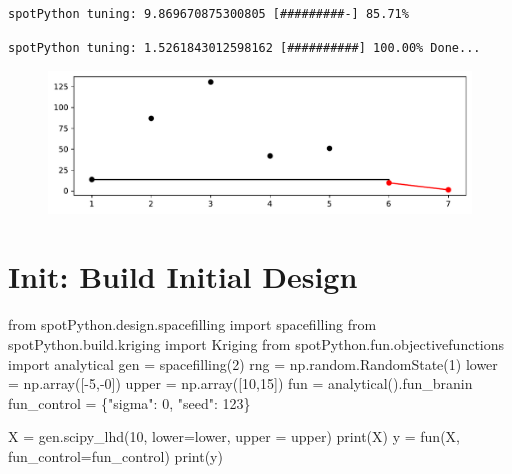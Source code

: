 \documentclass[
  letterpaper,
  DIV=11,
  numbers=noendperiod]{scrreprt}
\newenvironment{Shaded}{\begin{snugshade}}{\end{snugshade}}
\newcommand{\BuiltInTok}[1]{\textcolor[rgb]{0.00,0.23,0.31}{#1}}
\newcommand{\DecValTok}[1]{\textcolor[rgb]{0.68,0.00,0.00}{#1}}
\newcommand{\ImportTok}[1]{\textcolor[rgb]{0.00,0.46,0.62}{#1}}
\newcommand{\NormalTok}[1]{\textcolor[rgb]{0.00,0.23,0.31}{#1}}
\newcommand{\OperatorTok}[1]{\textcolor[rgb]{0.37,0.37,0.37}{#1}}
\newcommand{\StringTok}[1]{\textcolor[rgb]{0.13,0.47,0.30}{#1}}
\begin{document}
\begin{verbatim}
spotPython tuning: 9.869670875300805 [#########-] 85.71% 
\end{verbatim}

\begin{verbatim}
spotPython tuning: 1.5261843012598162 [##########] 100.00% Done...
\end{verbatim}

\begin{figure}[H]

{\centering \includegraphics{a_04_spot_doc_files/figure-pdf/cell-10-output-3.pdf}

}

\end{figure}

\hypertarget{init-build-initial-design-1}{%
\section{Init: Build Initial Design}\label{init-build-initial-design-1}}

\begin{Shaded}
\begin{Highlighting}[]
\ImportTok{from}\NormalTok{ spotPython.design.spacefilling }\ImportTok{import}\NormalTok{ spacefilling}
\ImportTok{from}\NormalTok{ spotPython.build.kriging }\ImportTok{import}\NormalTok{ Kriging}
\ImportTok{from}\NormalTok{ spotPython.fun.objectivefunctions }\ImportTok{import}\NormalTok{ analytical}
\NormalTok{gen }\OperatorTok{=}\NormalTok{ spacefilling(}\DecValTok{2}\NormalTok{)}
\NormalTok{rng }\OperatorTok{=}\NormalTok{ np.random.RandomState(}\DecValTok{1}\NormalTok{)}
\NormalTok{lower }\OperatorTok{=}\NormalTok{ np.array([}\OperatorTok{{-}}\DecValTok{5}\NormalTok{,}\OperatorTok{{-}}\DecValTok{0}\NormalTok{])}
\NormalTok{upper }\OperatorTok{=}\NormalTok{ np.array([}\DecValTok{10}\NormalTok{,}\DecValTok{15}\NormalTok{])}
\NormalTok{fun }\OperatorTok{=}\NormalTok{ analytical().fun\_branin}
\NormalTok{fun\_control }\OperatorTok{=}\NormalTok{ \{}\StringTok{"sigma"}\NormalTok{: }\DecValTok{0}\NormalTok{,}
               \StringTok{"seed"}\NormalTok{: }\DecValTok{123}\NormalTok{\}}

\NormalTok{X }\OperatorTok{=}\NormalTok{ gen.scipy\_lhd(}\DecValTok{10}\NormalTok{, lower}\OperatorTok{=}\NormalTok{lower, upper }\OperatorTok{=}\NormalTok{ upper)}
\BuiltInTok{print}\NormalTok{(X)}
\NormalTok{y }\OperatorTok{=}\NormalTok{ fun(X, fun\_control}\OperatorTok{=}\NormalTok{fun\_control)}
\BuiltInTok{print}\NormalTok{(y)}
\end{Highlighting}
\end{Shaded}
\end{document}
